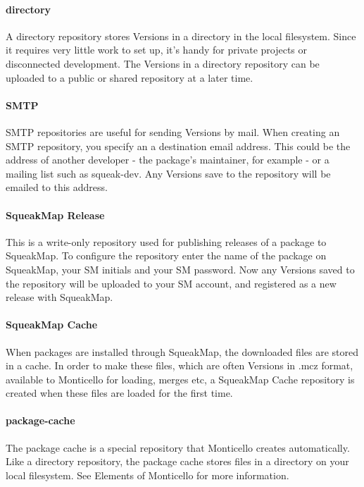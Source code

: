 \paragraph{directory}

A directory repository stores Versions in a directory in the local filesystem. Since it requires very little work to set up, it's handy for private projects or disconnected development. The Versions in a directory repository can be uploaded to a public or shared repository at a later time.

\paragraph{SMTP}

SMTP repositories are useful for sending Versions by mail. When creating an SMTP repository, you specify an a destination email address. This could be the address of another developer - the package's maintainer, for example - or a mailing list such as squeak-dev. Any Versions save to the repository will be emailed to this address.

\paragraph{SqueakMap Release}

This is a write-only repository used for publishing releases of a package to SqueakMap. To configure the repository enter the name of the package on SqueakMap, your SM initials and your SM password. Now any Versions saved to the repository will be uploaded to your SM account, and registered as a new release with SqueakMap.

\paragraph{SqueakMap Cache}

When packages are installed through SqueakMap, the downloaded files are stored in a cache. In order to make these files, which are often Versions in .mcz format, available to Monticello for loading, merges etc, a SqueakMap Cache repository is created when these files are loaded for the first time.

\paragraph{package-cache}

The package cache is a special repository that Monticello creates automatically. Like a directory repository, the package cache stores files in a directory on your local filesystem. See Elements of Monticello for more information.


